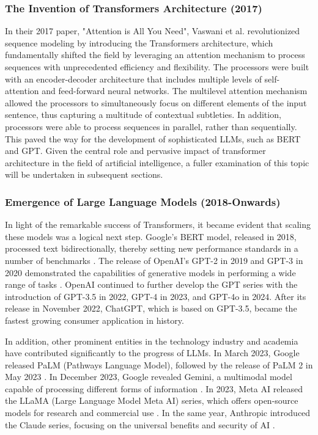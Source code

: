 \subsubsection{The Invention of Transformers Architecture (2017)}

In their 2017 paper, "Attention is All You Need", Vaswani et al. \cite{vaswani2017attention} revolutionized sequence modeling by introducing the Transformers architecture, which fundamentally shifted the field by leveraging an attention mechanism to process sequences with unprecedented efficiency and flexibility. The processors were built with an encoder-decoder architecture that includes multiple levels of self-attention and feed-forward neural networks. The multilevel attention mechanism allowed the processors to simultaneously focus on different elements of the input sentence, thus capturing a multitude of contextual subtleties. In addition, processors were able to process sequences in parallel, rather than sequentially. This paved the way for the development of sophisticated LLMs, such as BERT and GPT. Given the central role and pervasive impact of transformer architecture in the field of artificial intelligence, a fuller examination of this topic will be undertaken in subsequent sections.

\subsubsection{Emergence of Large Language Models (2018-Onwards)}

In light of the remarkable success of Transformers, it became evident that scaling these models was a logical next step. Google's BERT model, released in 2018, processed text bidirectionally, thereby setting new performance standards in a number of benchmarks \cite{devlin2018bert}. The release of OpenAI's GPT-2 in 2019 and GPT-3 in 2020 demonstrated the capabilities of generative models in performing a wide range of tasks \cite{radford2019language}. OpenAI continued to further develop the GPT series with the introduction of GPT-3.5 in 2022, GPT-4 in 2023, and GPT-4o in 2024. After its release in November 2022, ChatGPT, which is based on GPT-3.5, became the fastest growing consumer application in history.

In addition, other prominent entities in the technology industry and academia have contributed significantly to the progress of LLMs. In March 2023, Google released PaLM (Pathways Language Model), followed by the release of PaLM 2 in May 2023 \cite{chowdhery2023palm}. In December 2023, Google revealed Gemini, a multimodal model capable of processing different forms of information \cite{team2023gemini}. In 2023, Meta AI released the LLaMA (Large Language Model Meta AI) series, which offers open-source models for research and commercial use \cite{touvron2023llama}. In the same year, Anthropic introduced the Claude series, focusing on the universal benefits and security of AI \cite{anthropic2024claude}.

